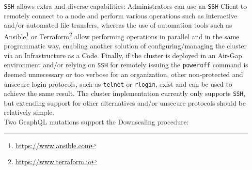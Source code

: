 \texttt{SSH} allows extra and diverse capabilities: Administrators can use an
\texttt{SSH} Client to remotely connect to a node and perform various operations
such as interactive and/or automated file transfers, whereas the use of
automation tools such as Ansible\footnote{\url{https://www.ansible.com}} or
Terraform\footnote{\url{https://www.terraform.io}} allow performing operations
in parallel and in the same programmatic way, enabling another solution of configuring/managing
the cluster via an Infrastructure as a Code. Finally, if the cluster is deployed
in an Air-Gap environment and/or relying on \texttt{SSH} for remotely issuing
the \texttt{poweroff} command is deemed unnecessary or too verbose for an organization,
other non-protected and unsecure login protocols, such as \texttt{telnet} or
\texttt{rlogin}, exist and can be used to achieve the same result. The cluster implementation
currently only supports \texttt{SSH}, but extending support for other alternatives
and/or unsecure protocols should be relatively simple. \\ %
Two GraphQL mutations support the Downscaling procedure:
